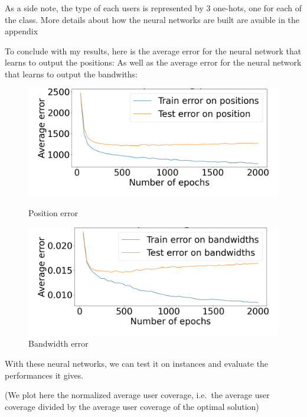 \documentclass[letterpaper]{article}
\begin{document}
As a side note, the type of each users is represented by 3 one-hots, one for each of the class.
More details about how the neural networks are built are avaible in the appendix

To conclude with my results, here is the average error for the neural network that learns to output the positions:
As well as the average error for the neural network that learns to output the bandwiths:

\begin{figure}[H]
    \centering
    \begin{minipage}[b]{0.45\textwidth}
        \centering
        \includegraphics[width=\textwidth]{images/mix_pos.png}
        \caption{Position error}
        \label{fig:image5}
    \end{minipage}
    \hspace{0.05\textwidth}
    \begin{minipage}[b]{0.45\textwidth}
        \centering
        \includegraphics[width=\textwidth]{images/bw_error_epochs.png}
        \caption{Bandwidth error}
        \label{fig:image6}
    \end{minipage}
\end{figure}

\;

With these neural networks, we can test it on instances and evaluate the performances it gives.

(We plot here the normalized average user coverage, i.e.\, the average user coverage divided by the average user coverage of the optimal solution)
\end{document}
